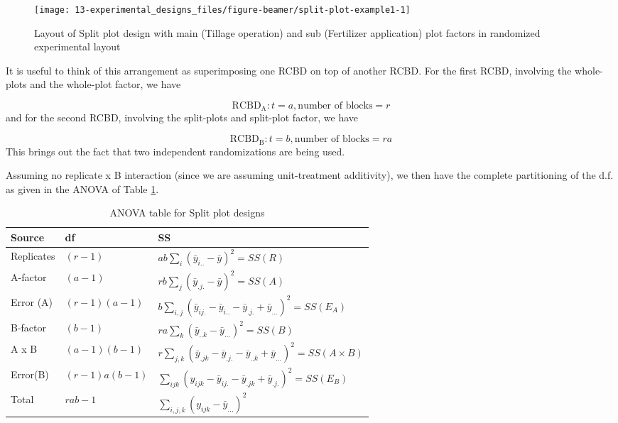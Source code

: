 \documentclass[
  ignorenonframetext,
  aspectratio=169]{beamer}
\begin{document}
\begin{frame}{}
\protect\hypertarget{section-11}{}
\begin{figure}
\texttt{[image: 13-experimental\_designs\_files/figure-beamer/split-plot-example1-1]} \caption{Layout of Split plot design with main (Tillage operation) and sub (Fertilizer application) plot factors in randomized experimental layout}\label{fig:split-plot-example1}
\end{figure}
\end{frame}

\begin{frame}{}
\protect\hypertarget{section-12}{}
\small

It is useful to think of this arrangement as superimposing one RCBD on
top of another RCBD. For the first RCBD, involving the whole-plots and
the whole-plot factor, we have

\[
\mathrm{RCBD_A}: t = a, \text{number of blocks} = r
\] and for the second RCBD, involving the split-plots and split-plot
factor, we have

\[
\mathrm{RCBD_B}: t = b, \text{number of blocks} = ra
\] This brings out the fact that two independent randomizations are
being used.
\end{frame}

\begin{frame}{}
\protect\hypertarget{section-13}{}
\small

Assuming no replicate x B interaction (since we are assuming
unit-treatment additivity), we then have the complete partitioning of
the d.f. as given in the ANOVA of Table \ref{tab:anova-split-plot}.

\begingroup\fontsize{8}{10}\selectfont

\begin{longtable}[t]{lll}
\caption{\label{tab:anova-split-plot}ANOVA table for Split plot designs}\\
\toprule
Source & df & SS\\
\midrule
Replicates & $(r-1)$ & $ab \sum_i{(\bar{y}_{i..} - \bar{y})^2} = SS(R)$\\
A-factor & $(a-1)$ & $rb \sum_j{(\bar{y}_{.j.} - \bar{y})^2} = SS(A)$\\
Error (A) & $(r-1)(a-1)$ & $b \sum_{i, j}{(\bar{y}_{ij.}- \bar{y}_{i..}- \bar{y}_{.j.}+ \bar{y}_{...})^2} = SS(E_A)$\\
B-factor & $(b-1)$ & $ra \sum_k{(\bar{y}_{..k} - \bar{y}_{...})^2} = SS(B)$\\
A x B & $(a-1)(b-1)$ & $r \sum_{j, k}{(\bar{y}_{.jk}- \bar{y}_{.j.}- \bar{y}_{..k}+ \bar{y}_{...})^2} = SS(A \times B)$\\
\addlinespace
Error(B) & $(r-1)a(b-1)$ & $\sum_{ijk}{(y_{ijk} - \bar{y}_{ij.} - \bar{y}_{.jk} + \bar{y}_{.j.})^2} = SS(E_B)$\\
Total & $rab-1$ & $\sum_{i,j,k}{(y_{ijk} - \bar{y}_{...})^2}$\\
\bottomrule
\end{longtable}
\endgroup{}
\end{frame}
\end{document}
